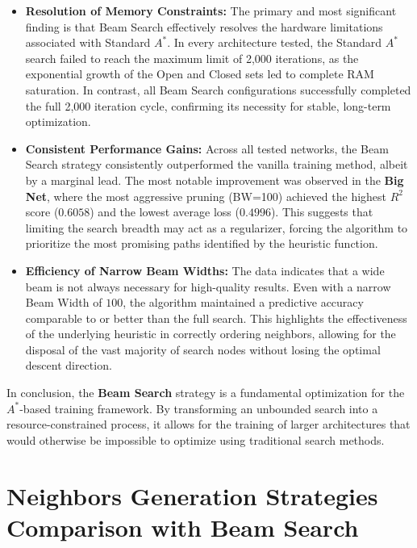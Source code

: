\begin{itemize}
    \item \textbf{Resolution of Memory Constraints:} The primary and most significant finding is that Beam Search effectively resolves the hardware limitations associated with Standard $A^*$. In every architecture tested, the Standard $A^*$ search failed to reach the maximum limit of 2,000 iterations, as the exponential growth of the Open and Closed sets led to complete RAM saturation. In contrast, all Beam Search configurations successfully completed the full 2,000 iteration cycle, confirming its necessity for stable, long-term optimization.
    
    \item \textbf{Consistent Performance Gains:} Across all tested networks, the Beam Search strategy consistently outperformed the vanilla training method, albeit by a marginal lead. The most notable improvement was observed in the \textbf{Big Net}, where the most aggressive pruning (BW=100) achieved the highest $R^2$ score ($0.6058$) and the lowest average loss ($0.4996$). This suggests that limiting the search breadth may act as a regularizer, forcing the algorithm to prioritize the most promising paths identified by the heuristic function.
    
    \item \textbf{Efficiency of Narrow Beam Widths:} The data indicates that a wide beam is not always necessary for high-quality results. Even with a narrow Beam Width of $100$, the algorithm maintained a predictive accuracy comparable to or better than the full search. This highlights the effectiveness of the underlying heuristic in correctly ordering neighbors, allowing for the disposal of the vast majority of search nodes without losing the optimal descent direction.
    \end{itemize}

In conclusion, the \textbf{Beam Search} strategy is a fundamental optimization for the $A^*$-based training framework. By transforming an unbounded search into a resource-constrained process, it allows for the training of larger architectures that would otherwise be impossible to optimize using traditional search methods.

\newpage

\section{Neighbors Generation Strategies Comparison with Beam Search}
\label{sec:strategies_comparison_bs}


